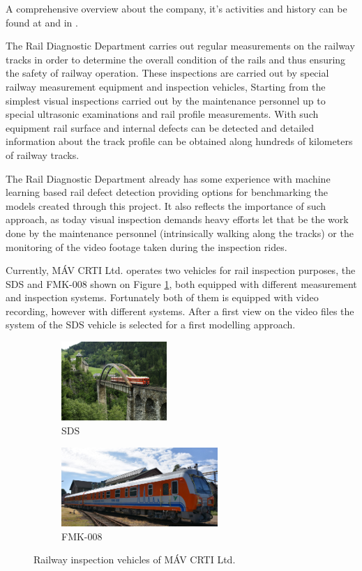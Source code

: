 A comprehensive overview about the company, it's activities and history can be found at
\cite{_mav_} and in \cite{kfv_25years}.

The Rail Diagnostic Department carries out regular measurements on the railway tracks in order
to determine the overall condition of the rails and thus ensuring the safety of railway operation.
These inspections are carried out by special railway measurement equipment and inspection vehicles,
Starting from the simplest visual inspections carried out by the maintenance personnel up to
special ultrasonic examinations and rail profile measurements.
With such equipment rail surface and internal defects can be detected and detailed information about
the track profile can be obtained along hundreds of kilometers of railway tracks.

The Rail Diagnostic Department already has some experience with machine learning based rail
defect detection providing options for benchmarking the models created through this project.
It also reflects the importance of such approach, as today visual inspection demands heavy efforts
let that be the work done by the maintenance personnel (intrinsically walking along the tracks)
or the monitoring of the video footage taken during the inspection rides.

Currently, MÁV CRTI Ltd. operates two vehicles for rail inspection purposes, the SDS and FMK-008 shown on
Figure \ref{fig:vehicles}, both equipped with different measurement and inspection systems.
Fortunately both of them is equipped with video recording, however with different systems.
After a first view on the video files the system of the SDS vehicle is selected for a first modelling
approach.

\begin{figure}[!ht]
    \centering
    \begin{subfigure}{0.45\textwidth}
        \centering
        \includegraphics[height=3cm]{./tex_images/sds.jpg}
        \caption*{SDS}
    \end{subfigure}
    \begin{subfigure}{0.45\textwidth}
        \centering
        \includegraphics[height=3cm]{./tex_images/FMK008.jpg}
        \caption*{FMK-008}
    \end{subfigure}
    \caption{Railway inspection vehicles of MÁV CRTI Ltd.}
    \label{fig:vehicles}
\end{figure}

